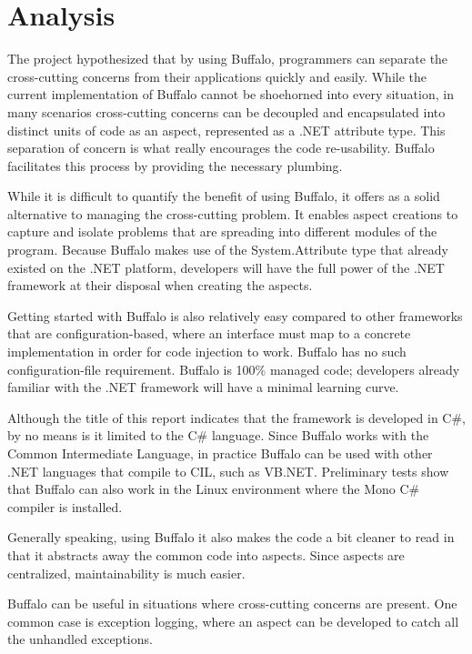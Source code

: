 \chapter{Analysis}

The project hypothesized that by using Buffalo, programmers can separate the cross-cutting concerns from their applications quickly and easily. While the current implementation of Buffalo cannot be shoehorned into every situation, in many scenarios cross-cutting concerns can be decoupled and encapsulated into distinct units of code as an aspect, represented as a .NET attribute type. This separation of concern is what really encourages the code re-usability. Buffalo facilitates this process by providing the necessary plumbing. 

While it is difficult to quantify the benefit of using Buffalo, it offers as a solid alternative to managing the cross-cutting problem. It enables aspect creations to capture and isolate problems that are spreading into different modules of the program. Because Buffalo makes use of the System.Attribute type that already existed on the .NET platform, developers will have the full power of the .NET framework at their disposal when creating the aspects. 

Getting started with Buffalo is also relatively easy compared to other frameworks that are configuration-based, where an interface must map to a concrete implementation in order for code injection to work. Buffalo has no such configuration-file requirement. Buffalo is 100\% managed code; developers already familiar with the .NET framework will have a minimal learning curve.

Although the title of this report indicates that the framework is developed in C\#, by no means is it limited to the C\# language. Since Buffalo works with the Common Intermediate Language, in practice Buffalo can be used with other .NET languages that compile to CIL, such as VB.NET. Preliminary tests show that Buffalo can also work in the Linux environment where the Mono C\# compiler is installed.

Generally speaking, using Buffalo it also makes the code a bit cleaner to read in that it abstracts away the common code into aspects. Since aspects are centralized, maintainability is much easier. 

Buffalo can be useful in situations where cross-cutting concerns are present. One common case is exception logging, where an aspect can be developed to catch all the unhandled exceptions.

